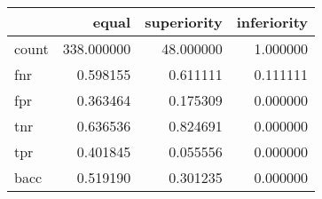 \begin{tabular}{lrrr}
\toprule
{} &       equal &  superiority &  inferiority \\
\midrule
count &  338.000000 &    48.000000 &     1.000000 \\
fnr   &    0.598155 &     0.611111 &     0.111111 \\
fpr   &    0.363464 &     0.175309 &     0.000000 \\
tnr   &    0.636536 &     0.824691 &     0.000000 \\
tpr   &    0.401845 &     0.055556 &     0.000000 \\
bacc  &    0.519190 &     0.301235 &     0.000000 \\
\bottomrule
\end{tabular}
